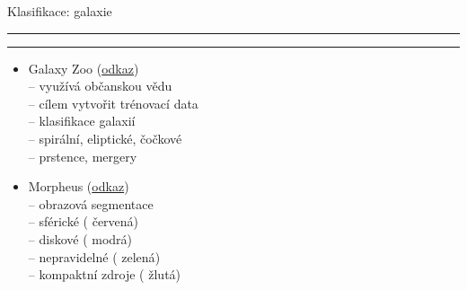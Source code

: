 \documentclass[aspectratio=43]{beamer}
\def\vs{\vspace{-2mm}}
\def\lend{\phantom{g}\vspace{1.5mm}\hrule\hrule}
\begin{document}
\begin{frame}{\vs Klasifikace: galaxie \lend}
\vspace{1mm}
\begin{itemize}
    \small
    \item<2-> Galaxy Zoo (\href{https://www.zooniverse.org/projects/zookeeper/galaxy-zoo/classify}{odkaz})\\ \vspace{2mm}
        -- využívá občanskou vědu\\ \vspace{1.8mm}
        -- cílem vytvořit trénovací data\\ \vspace{1.8mm}
        -- klasifikace galaxií\\ \vspace{1.8mm}
        \hspace{4mm}-- spirální, eliptické, čočkové\\ \vspace{1.8mm}
        \hspace{4mm}-- prstence, mergery\\ \vspace{3mm}
    \item<3-> Morpheus (\href{https://www.youtube.com/watch?v=hEL1h_dODkU}{odkaz})\\ \vspace{1.8mm}
        -- obrazová segmentace\\ \vspace{1.8mm}
        -- sférické ({\color{myred} červená})\\ \vspace{1.8mm}
        -- diskové ({\color{myblue} modrá})\\ \vspace{1.8mm}
        -- nepravidelné ({\color{mygreen} zelená}) \\ \vspace{1.8mm}
        -- kompaktní zdroje ({\color{myyellow} žlutá})\\ \vspace{1.8mm}
\end{itemize}
\end{frame}
\end{document}
